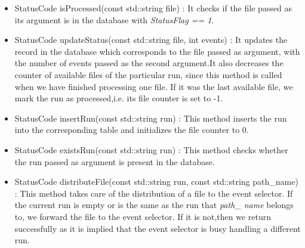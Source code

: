 \begin{itemize}
\item StatusCode isProcessed(const std::string file) : It checks if the file passed as its argument is in the database with \textit{StatusFlag == 1}.\par

\item StatusCode updateStatus(const std::string file, int events) : It updates the record in the database which corresponds to the file passed as argument, with the number of events passed as the second argument.It also decreases the counter of available files of the particular run, since this method is called when we have finished processing one file. If it was the last available file, we mark the run as processed,i.e. its file counter is set to -1.\par

\item StatusCode insertRun(const std::string run) : This method inserts the run into the corresponding table and initializes the file counter to 0.\par

\item StatusCode existsRun(const std::string run) : This method checks whether the run passed as argument is present in the database.\par

\item StatusCode distributeFile(const std::string run, const std::string path\_name) : This method takes care of the distribution of a file to the event selector. If the current run is empty or is the same as the run that \textit{path\_ name} belongs to, we forward the file to the event selector. If it is not,then we return successfully as it is implied that the event selector is busy handling a different run.\par
\end{itemize}


